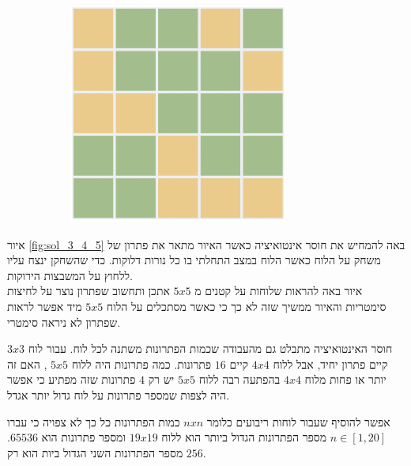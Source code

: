 \documentclass[12pt,twoside]{article}
\begin{document}
\begin{figure}[ht]
\begin{subfigure}[b]{.25\linewidth}
    \end{subfigure}
    \begin{subfigure}[b]{.25\linewidth}
    \includegraphics[width=\linewidth]{images/5x5_sol.PNG}
    \end{subfigure}

\end{figure}
\sethebrew

איור
\ref{fig:sol_3_4_5}
באה להמחיש את חוסר  אינטואיציה
כאשר האיור מתאר את פתרון של משחק על הלוח כאשר הלוח במצב התחלתי בו כל נורות דלוקות.
כדי שהשחקן ינצח עליו ללחוץ על המשבצות הירוקות.
\\
איור באה להראות שלוחות על קטנים מ
$5x5$
אתכן ותחשוב שפתרון נוצר על לחיצות סימטריות והאיור ממשיך שזה לא כך 
כי כאשר מסתכלים על הלוח 
$5x5$
מיד אפשר לראות שפתרון לא ניראה סימטרי.

חוסר האינטואיציה מתבלט גם מהעבודה שכמות הפתרונות משתנה לכל לוח.
עבור לוח 
$3x3$
קיים פתרון יחיד,
אבל ללוח 
$4x4$
קיים
$16$
פתרונות.
כמה פתרונות היה ללוח
$5x5$
,
האם זה יותר או פחות מלוח
$4x4$
בהפתעה רבה ללוח 
$5x5$
יש רק 
$4$
פתרונות שזה  מפתיע כי אפשר היה לצפות שמספר פתרונות על לוח גדול יותר אגדל.

אפשר להוסיף שעבור לוחות ריבועים כלומר
$n x n$
כמות הפתרונות כל כך לא צפויה כי עברו 
$n \in [1,20]$
מספר הפתרונות הגדול ביותר הוא ללוח
$19x19$
ומספר פתרונות 
הוא 
$65536$.
מספר הפתרונות השני הגדול ביות הוא רק
$256$.
\end{document}
